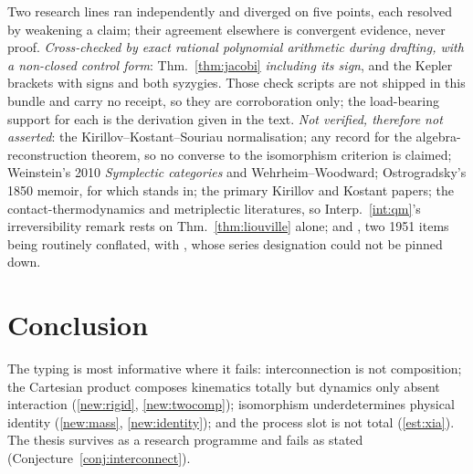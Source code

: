 \documentclass[12pt,a4paper]{article}
\theoremstyle{definition}
\theoremstyle{plain}
\theoremstyle{commentary}
\begin{document}
Two research lines ran independently and diverged on five points, each resolved by weakening a claim;
their agreement elsewhere is convergent evidence, never proof. \emph{Cross-checked by exact
rational polynomial arithmetic during drafting, with a non-closed control form}:
Thm.~\ref{thm:jacobi} \emph{including its sign}, and the Kepler brackets with signs and both
syzygies. Those check scripts are not shipped in this bundle and carry no receipt, so they are
corroboration only; the load-bearing support for each is the derivation given in the text.
\emph{Not verified, therefore not asserted}: the Kirillov--Kostant--Souriau normalisation; any record
for the algebra-reconstruction theorem, so no converse to the isomorphism criterion is claimed;
Weinstein's 2010 \emph{Symplectic categories} and Wehrheim--Woodward; Ostrogradsky's 1850 memoir, for
which \cite{Woodard2015} stands in; the primary Kirillov and Kostant papers; the
contact-thermodynamics and metriplectic literatures, so Interp.~\ref{int:qm}'s irreversibility remark
rests on Thm.~\ref{thm:liouville} alone; and \cite{vanHove1951}, two 1951 items being routinely
conflated, with \cite{Santilli1978}, whose series designation could not be pinned down.

\section{Conclusion}
\label{sec:conclusion}

The typing is most informative where it fails: interconnection is not composition; the Cartesian
product composes kinematics totally but dynamics only absent interaction (\ref{new:rigid},
\ref{new:twocomp}); isomorphism underdetermines physical identity (\ref{new:mass},
\ref{new:identity}); and the process slot is not total (\ref{est:xia}). The thesis survives as a
research programme and fails as stated (Conjecture~\ref{conj:interconnect}).
\end{document}
